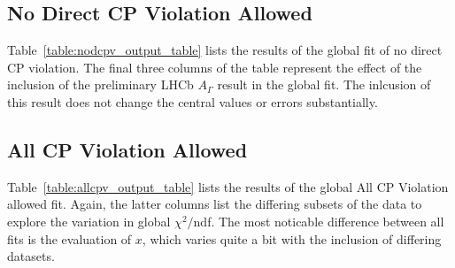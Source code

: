 \subsection{No Direct CP Violation Allowed}
Table~\ref{table:nodcpv_output_table} lists the results of the global fit of no direct
CP violation. The final three columns of the table represent the effect of the 
inclusion of the preliminary LHCb $A_\Gamma$ result in the global fit.
The inlcusion of this result does not change the central values or errors substantially.

\subsection{All CP Violation Allowed}
Table~\ref{table:allcpv_output_table} lists the results of the global All CP Violation
allowed fit. Again, the latter columns list the differing subsets of the data to explore
the variation in global $\chi^2/$ndf. The most noticable difference between all fits
is the evaluation of $x$, which varies quite a bit with the inclusion of differing datasets.


